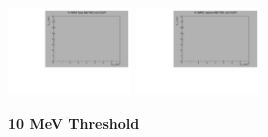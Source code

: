 \begin{center}
  \includegraphics[width=0.245\textwidth]{plots/response_matrix/Total_FHC_CC0Pi_null.pdf}
  \includegraphics[width=0.245\textwidth]{plots/response_matrix/Hadrons_FHC_CC0Pi_null.pdf}

\end{center}

\textbf{10 MeV Threshold}

